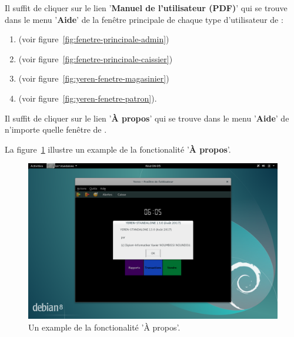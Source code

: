
\newpage
{}

Il suffit de cliquer sur le lien '\textbf{Manuel de l'utilisateur (PDF)}'
qui se trouve dans le menu '\textbf{Aide}' de la fen\^etre
principale de chaque type d'utilisateur de \yeren:

\begin{enumerate}[1)]
	\item \admin (voir figure~\ref{fig:fenetre-principale-admin})
	\item \caissier (voir figure~\ref{fig:fenetre-principale-caissier})
	\item \magasinier (voir figure~\ref{fig:yeren-fenetre-magasinier})
	\item \manager (voir figure~\ref{fig:yeren-fenetre-patron}).		
\end{enumerate}



Il suffit de cliquer sur le lien '\textbf{\`A propos}' qui
se trouve dans le menu '\textbf{Aide}' de n'importe quelle
fen\^etre de \yeren.

La figure~\ref{fig:yeren-apropos}
illustre un example de la fonctionalit\'e 
'\textbf{\`A propos}'.

\begin{figure}[!htbp]
	\centering
	\includegraphics[scale=0.369]{images/yeren-apropos.png}
	\caption{Un example de la fonctionalit\'e '\`A propos'.}
	\label{fig:yeren-apropos}
\end{figure}


